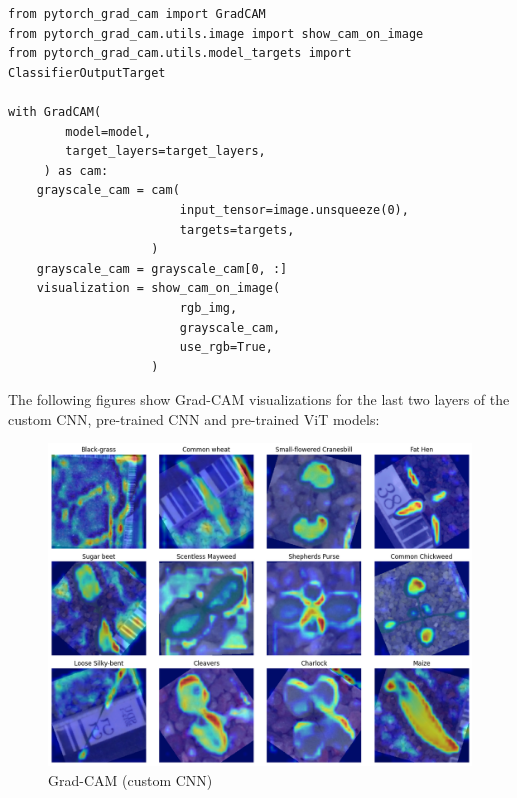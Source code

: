 \begin{minipage}{0.9\linewidth}\begin{lstlisting}[caption={Generate CAMs using Pytorch-Grad-CAM.},label={lst:grad-cam}]
from pytorch_grad_cam import GradCAM
from pytorch_grad_cam.utils.image import show_cam_on_image
from pytorch_grad_cam.utils.model_targets import ClassifierOutputTarget

with GradCAM(
        model=model,
        target_layers=target_layers,
     ) as cam:
    grayscale_cam = cam(
                        input_tensor=image.unsqueeze(0),
                        targets=targets,
                    )
    grayscale_cam = grayscale_cam[0, :]
    visualization = show_cam_on_image(
                        rgb_img,
                        grayscale_cam,
                        use_rgb=True,
                    )
\end{lstlisting}\end{minipage}

The following figures show Grad-CAM visualizations for the last two layers of the custom CNN, pre-trained CNN and pre-trained ViT models:

\begin{figure}[htbp]
    \centerline{\includegraphics[width=0.9\linewidth]{../../resources/custom_cnn/grad_cam.png}}
    \caption{Grad-CAM (custom CNN)}
    \label{fig:grad-cam-custom-cnn}
\end{figure}

